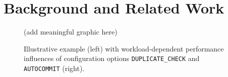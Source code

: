 \clearpage
\section{Background and Related Work}

\begin{figure}
	\color{red}(add meaningful graphic here)
	\caption{Illustrative example (left) with workload-dependent performance influences of configuration options \texttt{DUPLICATE\_CHECK} and \texttt{AUTOCOMMIT} (right).}
	\label{fig:intro}
\end{figure}

